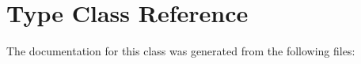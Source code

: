 \hypertarget{classstatic_01const_01StackFrame_1_1Type}{}\section{Type Class Reference}
\label{classstatic_01const_01StackFrame_1_1Type}


The documentation for this class was generated from the following files\+: